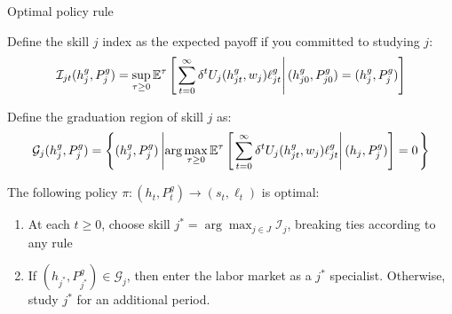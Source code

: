 \begin{frame}{Optimal policy rule}

Define the skill $j$ index as the expected payoff if you committed to studying $j$:
\begin{equation*}
\mathcal{I}_{jt} (h_{j}^g, P_{j}^g) = \sup_{\tau \geq 0} \mathbb{E}^\tau
\left[\left. 
   \sum_{t=0}^\infty \delta^t 
   U_j(h_{jt}^g, w_j) \ell_{jt}^g
 \right\vert 
    (h_{j0}^g, P_{j0}^g) = (h_{j}^g, P_{j}^g)
 \right]
\end{equation*}

Define the graduation region of skill $j$ as: 
\begin{equation*}
\mathcal{G}_j (h_{j}^g, P_{j}^g)  = 
    \left\{
        (h_{j}^g, P_{j}^g) 
        \left\vert
            \arg \max_{\tau \geq 0} 
            \mathbb{E}^\tau 
            \left[\left. 
                \sum_{t=0}^\infty \delta^t 
                U_j(h_{jt}^g, w_j) \ell_{jt}^g
             \right\vert 
                (h_j, P_j^g)
             \right] = 0
   \right. \right\}
\end{equation*}

The following policy $\pi: (h_t, P_t^g) \to (s_t, \ell_t)$ is optimal: 
\begin{enumerate}
    \item At each $t \geq 0$, choose skill $j^* = \arg \max_{j \in J} \mathcal{I}_j$, breaking ties according to any rule
    \item If $(h_{j^*}, P_{j^*}^g) \in \mathcal{G}_{j}$, then enter the labor market as a $j^*$ specialist. Otherwise, study $j^*$ for an additional period.  
\end{enumerate}

\end{frame}



